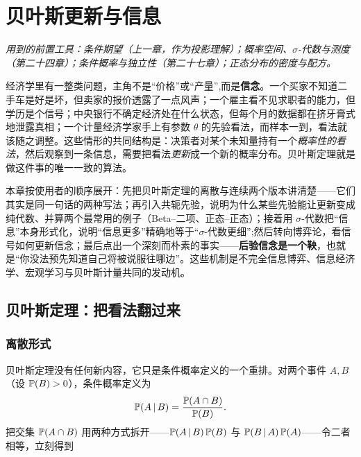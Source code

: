 \chapter{贝叶斯更新与信息}
\label{ch:bayes}

\noindent\emph{用到的前置工具：条件期望（上一章，作为投影理解）；概率空间、$\sigma$-代数与测度（第二十四章）；条件概率与独立性（第二十七章）；正态分布的密度与配方。}
\medskip

经济学里有一整类问题，主角不是``价格''或``产量'',而是\textbf{信念}。一个买家不知道二手车是好是坏，但卖家的报价透露了一点风声；一个雇主看不见求职者的能力，但学历是个信号；中央银行不确定经济处在什么状态，但每个月的数据都在挤牙膏式地泄露真相；一个计量经济学家手上有参数 $\theta$ 的先验看法，而样本一到，看法就该随之调整。这些情形的共同结构是：决策者对某个未知量持有一个\emph{概率性的看法}，然后观察到一条信息，需要把看法\emph{更新}成一个新的概率分布。贝叶斯定理就是做这件事的唯一一致的算法。

本章按使用者的顺序展开：先把贝叶斯定理的离散与连续两个版本讲清楚——它们其实是同一句话的两种写法；再引入共轭先验，说明为什么某些先验能让更新变成纯代数、并算两个最常用的例子（Beta--二项、正态--正态）；接着用 $\sigma$-代数把``信息''本身形式化，说明``信息更多''精确地等于``$\sigma$-代数更细'';然后转向博弈论，看信号如何更新信念；最后点出一个深刻而朴素的事实——\textbf{后验信念是一个鞅}，也就是``你没法预先知道自己将被说服往哪边''。这些机制是不完全信息博弈、信息经济学、宏观学习与贝叶斯计量共同的发动机。

\section{贝叶斯定理：把看法翻过来}
\label{sec:bayes-1}

\subsection{离散形式}

贝叶斯定理没有任何新内容，它只是条件概率定义的一个重排。对两个事件 $A,B$（设 $\mathbb{P}\!\left(B\right)>0$），条件概率定义为
\[
    \mathbb{P}\!\left(A\,\middle|\, B\right)=\frac{\mathbb{P}\!\left(A\cap B\right)}{\mathbb{P}\!\left(B\right)} .
\]
把交集 $\mathbb{P}\!\left(A\cap B\right)$ 用两种方式拆开——$\mathbb{P}\!\left(A\,\middle|\, B\right)\mathbb{P}\!\left(B\right)$ 与 $\mathbb{P}\!\left(B\,\middle|\, A\right)\mathbb{P}\!\left(A\right)$——令二者相等，立刻得到



